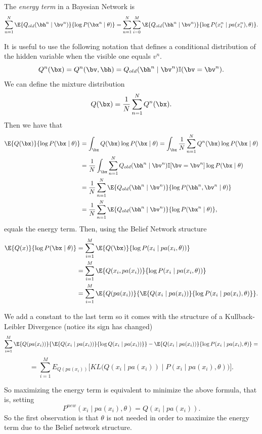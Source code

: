 The \emph{energy term} in a Bayesian Network is
\[
  \sum_{n=1}^{N} \E{Q_{old}(\bh^{n} \mid \bv^{n})}{ \log{P(\bx^{n} \mid \theta)} } = \sum_{n = 1}^{N}\sum_{i = 0}^{M} \E{Q_{old}(\bh^{n} \mid \bv^{n})}{\log{P( x_{i}^{n} \mid pa(x_{i}^{n}), \theta)}}.
\]

It is useful to use the following notation that defines a conditional distribution of the hidden variable when the visible one equals \(v^{n}\).
\[
  Q^{n}(\bx) = Q^{n}(\bv,\bh) = Q_{old}(\bh^{n} \mid \bv^{n}) \mathbb{I}(\bv = \bv^{n}).
\]
We can define the mixture distribution
\[
  Q(\bx) = \frac{1}{N}\sum_{n = 1}^{N}Q^{n}(\bx).
\]
Then we have that
\[
  \begin{aligned}
    \E{Q(\bx)}{\log{P(\bx \mid \theta)}} &= \int_{\bx}Q(\bx)\log{P(\bx \mid \theta)} =  \int_{\bx} \frac{1}{N}\sum_{n=1}^{N}Q^{n}(\bx)\log{P(\bx \mid \theta)} \\
    &= \frac{1}{N} \int_{\bx}\sum_{n=1}^{N}Q_{old}(\bh^n \mid \bv^{n})\mathbb{I}[\bv = \bv^{n}]\log{P(\bx \mid \theta)}\\
    &= \frac{1}{N}\sum_{n = 1}^{N}\E{Q_{old}(\bh^n \mid \bv^{n})} {\log{P(\bh^n, \bv^{n} \mid \theta)}}\\
    &= \frac{1}{N}\sum_{n = 1}^{N}\E{Q_{old}(\bh^n \mid \bv^{n})} {\log{P(\bx^{n} \mid \theta)}},
  \end{aligned}
\]
equals the energy term. Then, using the Belief Network structure
\[
  \begin{aligned}
    \E{Q(x)}{\log{P(\bx \mid \theta)}} &= \sum_{i = 1}^{M}\E{Q(\bx)}{\log{P(x_{i} \mid pa(x_{i}, \theta))}}\\
    &= \sum_{i = 1}^{M}\E{Q(x_{i}, pa(x_{i}))}{\log{P(x_{i} \mid pa(x_{i}, \theta))}}\\
    &= \sum_{i = 1}^{M}\E{Q(pa(x_{i}))}{ \E{Q(x_{i}\mid pa(x_{i}))}{ \log{P(x_{i} \mid pa(x_{i}), \theta)}}}.
\end{aligned}
\]

We add a constant to the last term so it comes with the structure of a Kullback-Leibler Divergence (notice its sign has changed)
\[
  \sum_{i = 1}^{M}\E{Q(pa(x_{i}))}{\E{Q(x_{i}\mid pa(x_{i}))}{\log{Q(x_{i} \mid pa(x_{i}))}}} - \E{Q(x_{i}\mid pa(x_{i}))}{\log{P(x_{i} \mid pa(x_{i}), \theta)}}=
\]
\[
  = \sum_{i = 1}^{M} E_{Q(pa(x_{i}))} \Big[KL \Big( Q(x_{i}\mid pa(x_{i})) \mid P(x_{i} \mid pa(x_{i}), \theta) \Big) \Big].
\]

So maximizing the energy term is equivalent to minimize the above formula, that is, setting
\[
  P^{new}(x_{i} \mid pa(x_{i}), \theta) = Q(x_{i} \mid pa(x_{i})).
\]
So the first observation is that \(\theta\) is not needed in order to maximize the energy term due to the Belief network structure.

